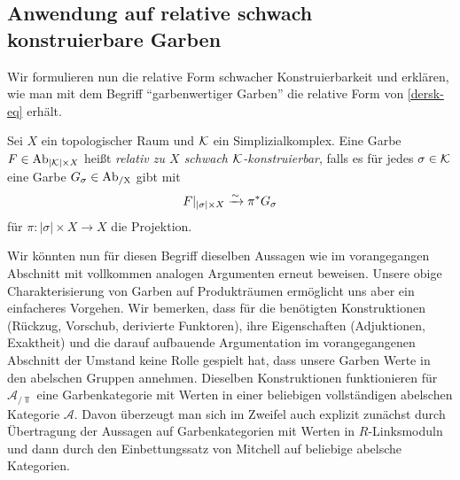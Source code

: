 \subsection{Anwendung auf relative schwach konstruierbare Garben} 

Wir formulieren nun die relative Form schwacher Konstruierbarkeit und
erklären, wie man mit dem Begriff ``garbenwertiger Garben'' die
relative Form von \ref{dersk-eq} erhält.
\begin{defn}
  Sei $X$ ein topologischer Raum und $\mathcal{K}$ ein Simplizialkomplex. Eine
  Garbe $F \in \operatorname{Ab}_{|\mathcal{K}| \times X}$ heißt \emph{relativ zu $X$ schwach
    $\mathcal{K}$-konstruierbar}, falls es für jedes $\sigma \in \mathcal{K}$ eine Garbe
  $G_\sigma \in \operatorname{Ab_{/X}}$ gibt mit
  \[ F|_{|\sigma| \times X} \xrightarrow[]{\sim} \pi^* G_\sigma \]
  für $\pi: |\sigma| \times X \to X$ die Projektion.
\end{defn}

Wir könnten nun für diesen Begriff dieselben Aussagen wie im
vorangegangen Abschnitt mit vollkommen analogen Argumenten erneut
beweisen. Unsere obige Charakterisierung von Garben auf Produkträumen
ermöglicht uns aber ein einfacheres Vorgehen. Wir bemerken, dass für
die benötigten Konstruktionen (Rückzug, Vorschub, derivierte
Funktoren), ihre Eigenschaften (Adjuktionen, Exaktheit) und die darauf
aufbauende Argumentation im vorangegangenen Abschnitt der Umstand
keine Rolle gespielt hat, dass unsere Garben Werte in den abelschen
Gruppen annehmen. Dieselben Konstruktionen funktionieren für
$\mathcal{A}_{/\Top}$ eine Garbenkategorie mit Werten in einer
beliebigen vollständigen abelschen Kategorie $\mathcal{A}$. Davon
überzeugt man sich im Zweifel auch explizit zunächst durch Übertragung
der Aussagen auf Garbenkategorien mit Werten in $R$-Linksmoduln und
dann durch den Einbettungssatz von Mitchell auf beliebige abelsche
Kategorien.

